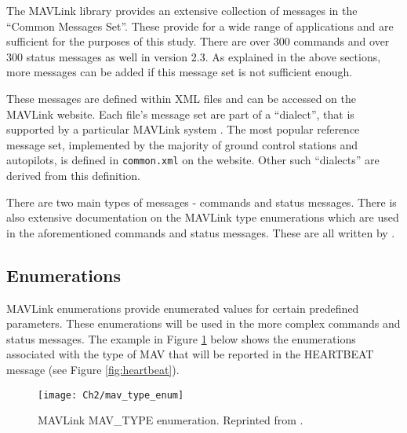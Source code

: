 The MAVLink library provides an extensive collection of messages in the “Common Messages Set”. These provide for a wide range of applications and are sufficient for the purposes of this study. There are over 300 commands and over 300 status messages as well in version 2.3. As explained in the above sections, more messages can be added if this message set is not sufficient enough. 

These messages are defined within XML files and can be accessed on the MAVLink website. Each file's message set are part of a ``dialect'', that is supported by a particular MAVLink system . The most popular reference message set, implemented by the majority of ground control stations and autopilots, is defined in \texttt{common.xml} on the website. Other such ``dialects'' are derived from this definition.


There are two main types of messages - commands and status messages. There is also extensive documentation on the MAVLink type enumerations which are used in the aforementioned commands and status messages. These are all written by .


\subsection{Enumerations}\label{sect:enum}

MAVLink enumerations provide enumerated values for certain predefined parameters. These enumerations will be used in the more complex commands and status messages. The example in Figure \ref{fig:enum} below shows the enumerations associated with the type of MAV that will be reported in the HEARTBEAT message (see Figure \ref{fig:heartbeat}).

\begin{figure}[t]
	\texttt{[image: Ch2/mav\_type\_enum]}
	\caption[MAVLink MAV\_TYPE enumeration.]{MAVLink MAV\_TYPE enumeration. Reprinted from \protect{}.}
	\label{fig:enum}
\end{figure}
\FloatBarrier

